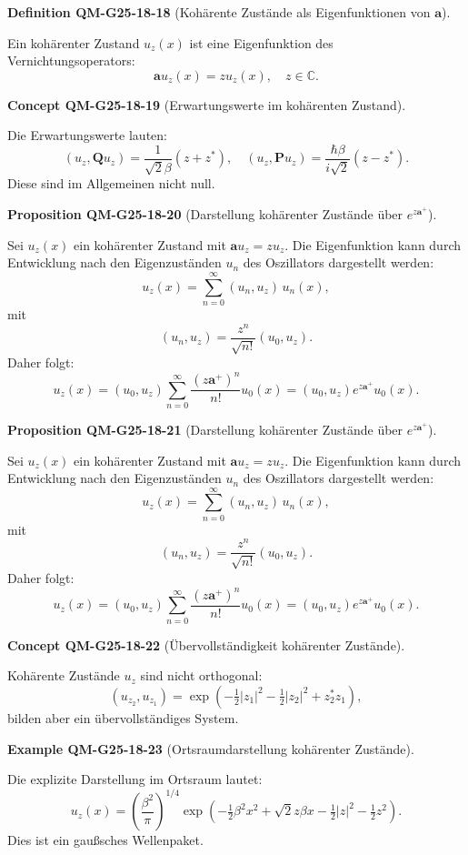 \documentclass[10pt, letterpaper]{article}
\newcommand{\CustomHeading}[3]{%
  \par\medskip\noindent%
  \textbf{#1 #2} \textnormal{(#3)}.\enskip%
}
\newenvironment{DEF}[2]{\CustomHeading{Definition}{#1}{#2}}{}
\newenvironment{PROP}[2]{\CustomHeading{Proposition}{#1}{#2}}{}
\newenvironment{EXA}[2]{\CustomHeading{Example}{#1}{#2}}{}
\newenvironment{CONC}[2]{\CustomHeading{Concept}{#1}{#2}}{}
\begin{document}
\begin{DEF}{QM-G25-18-18}{Kohärente Zustände als Eigenfunktionen von $\mathbf{a}$}
Ein kohärenter Zustand $u_z(x)$ ist eine Eigenfunktion des Vernichtungsoperators:
\[
\mathbf{a} u_z(x) = z u_z(x), \quad z \in \mathbb{C}.
\]
\end{DEF}

\begin{CONC}{QM-G25-18-19}{Erwartungswerte im kohärenten Zustand}
Die Erwartungswerte lauten:
\[
\left(u_z, \mathbf{Q} u_z\right) = \frac{1}{\sqrt{2} \beta} (z + z^*), \quad
\left(u_z, \mathbf{P} u_z\right) = \frac{\hbar \beta}{i \sqrt{2}} (z - z^*).
\]
Diese sind im Allgemeinen nicht null.
\end{CONC}

\begin{PROP}{QM-G25-18-20}{Darstellung kohärenter Zustände über $e^{z\mathbf{a}^+}$}
Sei $u_z(x)$ ein kohärenter Zustand mit $\mathbf{a} u_z = z u_z$. Die Eigenfunktion kann durch Entwicklung nach den Eigenzuständen $u_n$ des Oszillators dargestellt werden:
\[
u_z(x) = \sum_{n=0}^\infty (u_n, u_z) \, u_n(x),
\]
mit
\[
(u_n, u_z) = \frac{z^n}{\sqrt{n!}} (u_0, u_z).
\]
Daher folgt:
\[
u_z(x) = (u_0, u_z) \sum_{n=0}^\infty \frac{(z \mathbf{a}^+)^n}{n!} u_0(x) = (u_0, u_z) e^{z \mathbf{a}^+} u_0(x).
\]
\end{PROP}

\begin{PROP}{QM-G25-18-21}{Darstellung kohärenter Zustände über $e^{z\mathbf{a}^+}$}
Sei $u_z(x)$ ein kohärenter Zustand mit $\mathbf{a} u_z = z u_z$. Die Eigenfunktion kann durch Entwicklung nach den Eigenzuständen $u_n$ des Oszillators dargestellt werden:
\[
u_z(x) = \sum_{n=0}^\infty (u_n, u_z) \, u_n(x),
\]
mit
\[
(u_n, u_z) = \frac{z^n}{\sqrt{n!}} (u_0, u_z).
\]
Daher folgt:
\[
u_z(x) = (u_0, u_z) \sum_{n=0}^\infty \frac{(z \mathbf{a}^+)^n}{n!} u_0(x) = (u_0, u_z) e^{z \mathbf{a}^+} u_0(x).
\]
\end{PROP}

\begin{CONC}{QM-G25-18-22}{Übervollständigkeit kohärenter Zustände}
Kohärente Zustände $u_z$ sind nicht orthogonal:
\[
(u_{z_2}, u_{z_1}) = \exp\left(-\tfrac{1}{2}|z_1|^2 - \tfrac{1}{2}|z_2|^2 + z_2^* z_1\right),
\]
bilden aber ein übervollständiges System.
\end{CONC}

\begin{EXA}{QM-G25-18-23}{Ortsraumdarstellung kohärenter Zustände}
Die explizite Darstellung im Ortsraum lautet:
\[
u_z(x) = \left( \frac{\beta^2}{\pi} \right)^{1/4} \exp\left( -\tfrac{1}{2} \beta^2 x^2 + \sqrt{2} z \beta x - \tfrac{1}{2}|z|^2 - \tfrac{1}{2}z^2 \right).
\]
Dies ist ein gaußsches Wellenpaket.
\end{EXA}
\end{document}
